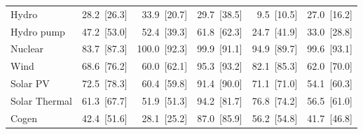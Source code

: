 \begin{tabular}{l r r r r r}
Hydro & 28.2~{\color{seasoncol}\scriptsize[26.3]} & 33.9~{\color{seasoncol}\scriptsize[20.7]} & 29.7~{\color{seasoncol}\scriptsize[38.5]} & 9.5~{\color{seasoncol}\scriptsize[10.5]} & 27.0~{\color{seasoncol}\scriptsize[16.2]} \\
Hydro pump & 47.2~{\color{seasoncol}\scriptsize[53.0]} & 52.4~{\color{seasoncol}\scriptsize[39.3]} & 61.8~{\color{seasoncol}\scriptsize[62.3]} & 24.7~{\color{seasoncol}\scriptsize[41.9]} & 33.0~{\color{seasoncol}\scriptsize[28.8]} \\
Nuclear & 83.7~{\color{seasoncol}\scriptsize[87.3]} & 100.0~{\color{seasoncol}\scriptsize[92.3]} & 99.9~{\color{seasoncol}\scriptsize[91.1]} & 94.9~{\color{seasoncol}\scriptsize[89.7]} & 99.6~{\color{seasoncol}\scriptsize[93.1]} \\
Wind & 68.6~{\color{seasoncol}\scriptsize[76.2]} & 60.0~{\color{seasoncol}\scriptsize[62.1]} & 95.3~{\color{seasoncol}\scriptsize[93.2]} & 82.1~{\color{seasoncol}\scriptsize[85.3]} & 62.0~{\color{seasoncol}\scriptsize[70.0]} \\
Solar PV & 72.5~{\color{seasoncol}\scriptsize[78.3]} & 60.4~{\color{seasoncol}\scriptsize[59.8]} & 91.4~{\color{seasoncol}\scriptsize[90.0]} & 71.1~{\color{seasoncol}\scriptsize[71.0]} & 54.1~{\color{seasoncol}\scriptsize[60.3]} \\
Solar Thermal & 61.3~{\color{seasoncol}\scriptsize[67.7]} & 51.9~{\color{seasoncol}\scriptsize[51.3]} & 94.2~{\color{seasoncol}\scriptsize[81.7]} & 76.8~{\color{seasoncol}\scriptsize[74.2]} & 56.5~{\color{seasoncol}\scriptsize[61.0]} \\
Cogen & 42.4~{\color{seasoncol}\scriptsize[51.6]} & 28.1~{\color{seasoncol}\scriptsize[25.2]} & 87.0~{\color{seasoncol}\scriptsize[85.9]} & 56.2~{\color{seasoncol}\scriptsize[54.8]} & 41.7~{\color{seasoncol}\scriptsize[46.8]} \\
\bottomrule
\end{tabular}

